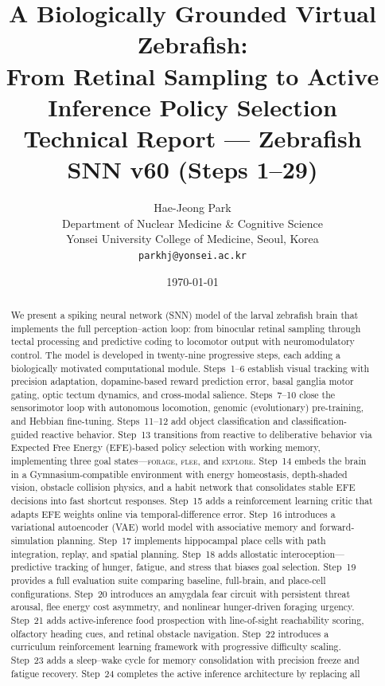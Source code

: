 \documentclass[11pt,a4paper]{article}
\title{%
  \textbf{A Biologically Grounded Virtual Zebrafish:\\
  From Retinal Sampling to Active Inference Policy Selection}\\[8pt]
  \large Technical Report --- Zebrafish SNN v60 (Steps 1--29)
}
\author{Hae-Jeong Park\\
  Department of Nuclear Medicine \& Cognitive Science\\
  Yonsei University College of Medicine, Seoul, Korea\\
  \texttt{parkhj@yonsei.ac.kr}
}
\date{\today}
\begin{document}
\maketitle

\begin{abstract}
We present a spiking neural network (SNN) model of the larval zebrafish brain
that implements the full perception--action loop: from binocular retinal
sampling through tectal processing and predictive coding to locomotor output
with neuromodulatory control.
The model is developed in twenty-nine progressive steps, each adding a
biologically motivated computational module.
Steps~1--6 establish visual tracking with precision adaptation, dopamine-based
reward prediction error, basal ganglia motor gating, optic tectum dynamics,
and cross-modal salience.
Steps~7--10 close the sensorimotor loop with autonomous locomotion,
genomic (evolutionary) pre-training, and Hebbian fine-tuning.
Steps~11--12 add object classification and classification-guided reactive
behavior.
Step~13 transitions from reactive to deliberative behavior via Expected Free
Energy (EFE)-based policy selection with working memory, implementing three
goal states---\textsc{forage}, \textsc{flee}, and \textsc{explore}.
Step~14 embeds the brain in a Gymnasium-compatible environment with energy
homeostasis, depth-shaded vision, obstacle collision physics, and a habit
network that consolidates stable EFE decisions into fast shortcut responses.
Step~15 adds a reinforcement learning critic that adapts EFE weights online
via temporal-difference error.
Step~16 introduces a variational autoencoder (VAE) world model with
associative memory and forward-simulation planning.
Step~17 implements hippocampal place cells with path integration, replay, and
spatial planning.
Step~18 adds allostatic interoception---predictive tracking of hunger,
fatigue, and stress that biases goal selection.
Step~19 provides a full evaluation suite comparing baseline, full-brain, and
place-cell configurations.
Step~20 introduces an amygdala fear circuit with persistent threat arousal,
flee energy cost asymmetry, and nonlinear hunger-driven foraging urgency.
Step~21 adds active-inference food prospection with line-of-sight
reachability scoring, olfactory heading cues, and retinal obstacle navigation.
Step~22 introduces a curriculum reinforcement learning framework with
progressive difficulty scaling.
Step~23 adds a sleep--wake cycle for memory consolidation with precision
freeze and fatigue recovery.
Step~24 completes the active inference architecture by replacing all

\end{abstract}
\end{document}

